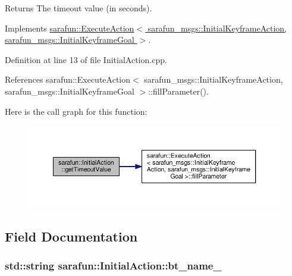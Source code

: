 \begin{DoxyReturn}{Returns}
The timeout value (in seconds). 
\end{DoxyReturn}


Implements \hyperlink{classsarafun_1_1ExecuteAction_aba6cfa8a8ce19e735eb6394424df6d17_aba6cfa8a8ce19e735eb6394424df6d17}{sarafun\-::\-Execute\-Action$<$ sarafun\-\_\-msgs\-::\-Initial\-Keyframe\-Action, sarafun\-\_\-msgs\-::\-Initial\-Keyframe\-Goal $>$}.



Definition at line 13 of file Initial\-Action.\-cpp.



References sarafun\-::\-Execute\-Action$<$ sarafun\-\_\-msgs\-::\-Initial\-Keyframe\-Action, sarafun\-\_\-msgs\-::\-Initial\-Keyframe\-Goal $>$\-::fill\-Parameter().



Here is the call graph for this function\-:\nopagebreak
\begin{figure}[H]
\begin{center}
\leavevmode
\includegraphics[width=350pt]{d6/d64/classsarafun_1_1InitialAction_a1b58c06c32ec9f9d3e75c37de5e7d2c8_a1b58c06c32ec9f9d3e75c37de5e7d2c8_cgraph}
\end{center}
\end{figure}




\subsection{Field Documentation}
\hypertarget{classsarafun_1_1InitialAction_aaa1d120b5ff08ffaebe777d8f3793be3_aaa1d120b5ff08ffaebe777d8f3793be3}{
\subsubsection[{bt\-\_\-name\-\_\-}]{\setlength{\rightskip}{0pt plus 5cm}std\-::string sarafun\-::\-Initial\-Action\-::bt\-\_\-name\-\_\-\hspace{0.3cm}{\ttfamily [private]}}}\label{classsarafun_1_1InitialAction_aaa1d120b5ff08ffaebe777d8f3793be3_aaa1d120b5ff08ffaebe777d8f3793be3}


